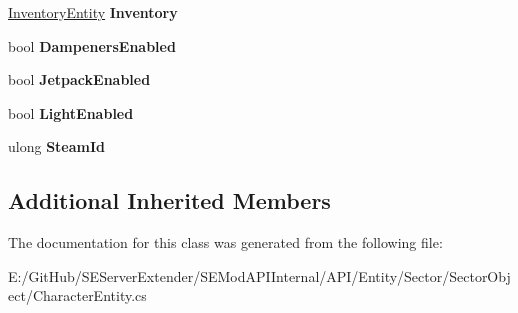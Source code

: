 \begin{DoxyCompactItemize}
\item 
\hypertarget{class_s_e_mod_a_p_i_internal_1_1_a_p_i_1_1_entity_1_1_sector_1_1_sector_object_1_1_character_entity_ad782d083f45bd059f27dcb03a941b56b}{}\hyperlink{class_s_e_mod_a_p_i_internal_1_1_a_p_i_1_1_entity_1_1_inventory_entity}{Inventory\+Entity} {\bfseries Inventory}\label{class_s_e_mod_a_p_i_internal_1_1_a_p_i_1_1_entity_1_1_sector_1_1_sector_object_1_1_character_entity_ad782d083f45bd059f27dcb03a941b56b}

\item 
\hypertarget{class_s_e_mod_a_p_i_internal_1_1_a_p_i_1_1_entity_1_1_sector_1_1_sector_object_1_1_character_entity_a12dd50fb3a67fabf8db309be52ea04e0}{}bool {\bfseries Dampeners\+Enabled}\label{class_s_e_mod_a_p_i_internal_1_1_a_p_i_1_1_entity_1_1_sector_1_1_sector_object_1_1_character_entity_a12dd50fb3a67fabf8db309be52ea04e0}

\item 
\hypertarget{class_s_e_mod_a_p_i_internal_1_1_a_p_i_1_1_entity_1_1_sector_1_1_sector_object_1_1_character_entity_af8c083d6c11df96aeab3c070f922f83f}{}bool {\bfseries Jetpack\+Enabled}\label{class_s_e_mod_a_p_i_internal_1_1_a_p_i_1_1_entity_1_1_sector_1_1_sector_object_1_1_character_entity_af8c083d6c11df96aeab3c070f922f83f}

\item 
\hypertarget{class_s_e_mod_a_p_i_internal_1_1_a_p_i_1_1_entity_1_1_sector_1_1_sector_object_1_1_character_entity_a12b8506921db6a790304c0b2d5443042}{}bool {\bfseries Light\+Enabled}\label{class_s_e_mod_a_p_i_internal_1_1_a_p_i_1_1_entity_1_1_sector_1_1_sector_object_1_1_character_entity_a12b8506921db6a790304c0b2d5443042}

\item 
\hypertarget{class_s_e_mod_a_p_i_internal_1_1_a_p_i_1_1_entity_1_1_sector_1_1_sector_object_1_1_character_entity_ae1d369425333f49bffc495412444b049}{}ulong {\bfseries Steam\+Id}\label{class_s_e_mod_a_p_i_internal_1_1_a_p_i_1_1_entity_1_1_sector_1_1_sector_object_1_1_character_entity_ae1d369425333f49bffc495412444b049}

\end{DoxyCompactItemize}
\subsection*{Additional Inherited Members}


The documentation for this class was generated from the following file\+:\begin{DoxyCompactItemize}
\item 
E\+:/\+Git\+Hub/\+S\+E\+Server\+Extender/\+S\+E\+Mod\+A\+P\+I\+Internal/\+A\+P\+I/\+Entity/\+Sector/\+Sector\+Object/Character\+Entity.\+cs\end{DoxyCompactItemize}
